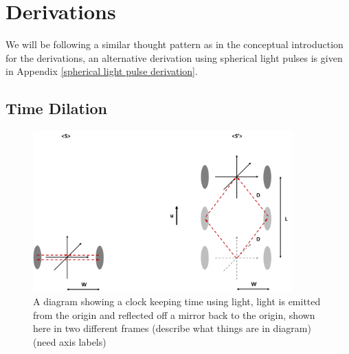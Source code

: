 \section{Derivations}%
We will be following a similar thought pattern as in the conceptual introduction for the derivations, an alternative derivation using spherical light pulses is given in Appendix \ref{spherical light pulse derivation}.

\subsection{Time Dilation}

\begin{figure}[ht]
	\centering
	\includegraphics[width=10cm]{images/pdf/Light_clock.pdf}
	\caption{A diagram showing a clock keeping time using light, light is emitted from the origin and reflected off a mirror back to the origin, shown here in two different frames (describe what things are in diagram)(need axis labels)}
	\label{fig: light clock}
\end{figure}

